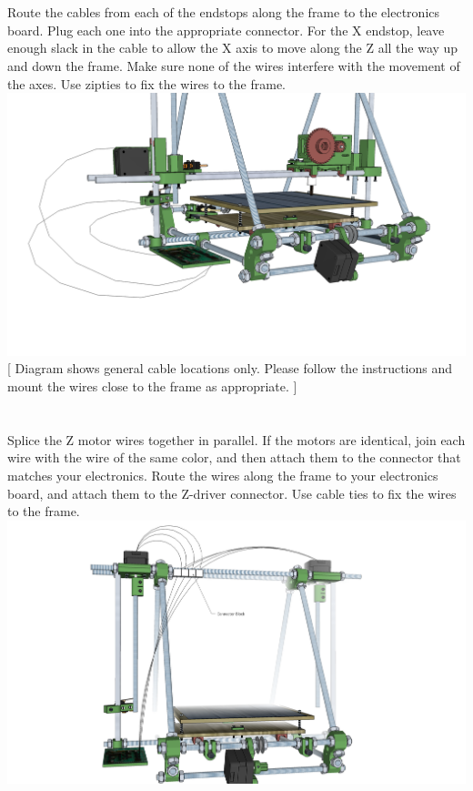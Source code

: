 \documentclass[twoside,openany,a4paper,titlepage]{memoir}
\begin{document}
	\section{}
	Route the cables from each of the endstops along the frame to the electronics board. Plug each one
	into the appropriate connector. For the X endstop, leave enough slack in the cable to allow the X axis to
	move along the Z all the way up and down the frame. Make sure none of the wires interfere with the
	movement of the axes. Use zipties to fix the wires to the frame.\\
	\includegraphics[width=1\linewidth]{graphics/ch10_12.png}
	[ Diagram shows general cable locations only. Please follow the instructions and mount the wires
	close to the frame as appropriate. ]
	
	\section{}
	Splice the Z motor wires together in parallel. If the motors are identical, join each wire with the wire of
	the same color, and then attach them to the connector that matches your electronics. Route the wires
	along the frame to your electronics board, and attach them to the Z-driver connector. Use cable ties to
	fix the wires to the frame.\\
	\includegraphics[width=1\linewidth]{graphics/ch10_13.png}
	
\end{document}
